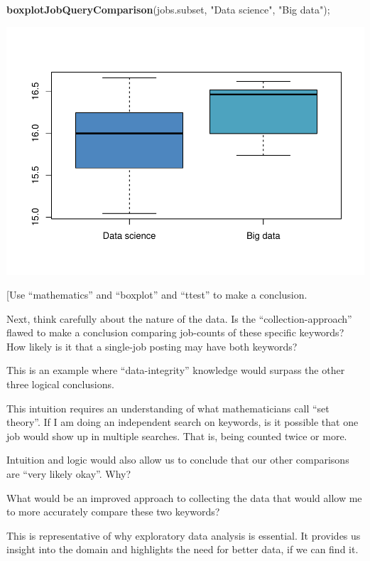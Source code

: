 \documentclass[
]{article}
\newenvironment{Shaded}{\begin{snugshade}}{\end{snugshade}}
\newcommand{\KeywordTok}[1]{\textcolor[rgb]{0.13,0.29,0.53}{\textbf{#1}}}
\newcommand{\NormalTok}[1]{#1}
\newcommand{\StringTok}[1]{\textcolor[rgb]{0.31,0.60,0.02}{#1}}
\begin{document}
\begin{Shaded}
\begin{Highlighting}[]
\KeywordTok{boxplotJobQueryComparison}\NormalTok{(jobs.subset, }\StringTok{"Data science"}\NormalTok{, }\StringTok{"Big data"}\NormalTok{);}
\end{Highlighting}
\end{Shaded}

\includegraphics{graphics/chunk-plotting-jobs-trends-big-data-2.pdf}

{[}Use ``mathematics'' and ``boxplot'' and ``ttest'' to make a
conclusion.

Next, think carefully about the nature of the data. Is the
``collection-approach'' flawed to make a conclusion comparing job-counts
of these specific keywords? How likely is it that a single-job posting
may have both keywords?

This is an example where ``data-integrity'' knowledge would surpass the
other three logical conclusions.

This intuition requires an understanding of what mathematicians call
``set theory''. If I am doing an independent search on keywords, is it
possible that one job would show up in multiple searches. That is, being
counted twice or more.

Intuition and logic would also allow us to conclude that our other
comparisons are ``very likely okay''. Why?

What would be an improved approach to collecting the data that would
allow me to more accurately compare these two keywords?

This is representative of why exploratory data analysis is essential. It
provides us insight into the domain and highlights the need for better
data, if we can find it.
\end{document}
